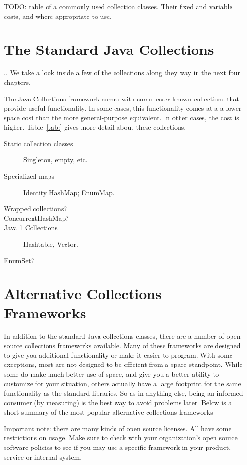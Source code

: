 
TODO: table of a commonly used collection classes. Their fixed and variable
costs, and where appropriate to use. 

\section{The Standard Java Collections}

.. We take a look inside a few of the collections along they way in the next
four chapters. 

The Java Collections framework comes with some lesser-known collections that
provide useful functionality.  In some cases, this functionality comes at a 
a lower space cost than the more general-purpose equivalent.  In other cases,
the cost is higher. Table~\ref{tab:} gives more detail about these collections.

\begin{description}
\item[Static collection classes] Singleton, empty, etc.
\item[Specialized maps] Identity HashMap; EnumMap.
\item[Wrapped collections?]
\item[ConcurrentHashMap?]
\item[Java 1 Collections] Hashtable, Vector.
\item[EnumSet?]
\end{description}


\section{Alternative Collections Frameworks}
In addition to the standard Java collections classes, there are a number of
open source collections frameworks available. Many of these frameworks
are designed to give you additional functionality or make it easier to
program. With some exceptions, most are not designed to be efficient from a
space standpoint. While some do make much better use of space, and give you a
better ability to customize for your situation, others actually have a
large footprint for the same functionality as the standard libraries. So as in
anything else, being an informed consumer (by measuring) is the best way to
avoid problems later. Below is a short summary of the most
popular alternative collections frameworks.

Important note: there are many kinds of open source licenses. All have some
restrictions on usage. Make sure to check with your organization's open
source software policies to see if you may use a specific framework in 
your product, service or internal system.


